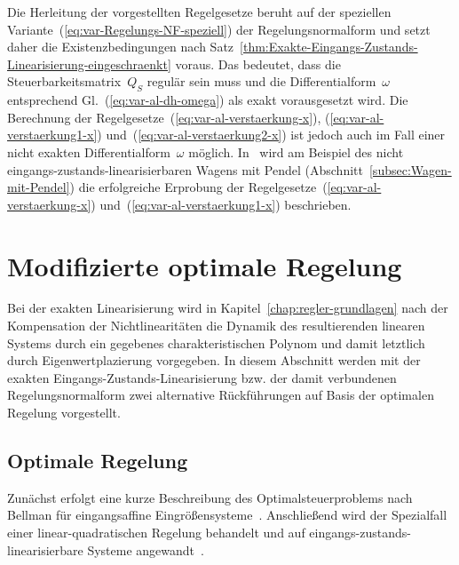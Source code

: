 \medskip{}

Die Herleitung der vorgestellten Regelgesetze beruht auf der speziellen
Variante~(\ref{eq:var-Regelungs-NF-speziell}) der Regelungsnormalform
und setzt daher die Existenzbedingungen nach Satz~\ref{thm:Exakte-Eingangs-Zustands-Linearisierung-eingeschraenkt}
voraus. Das bedeutet, dass die Steuerbarkeitsmatrix~$Q_{S}$ regulär
sein muss und die Differentialform~$\omega$ entsprechend Gl.~(\ref{eq:var-al-dh-omega})
als exakt vorausgesetzt wird. Die Berechnung der Regelgesetze~(\ref{eq:var-al-verstaerkung-x}),
(\ref{eq:var-al-verstaerkung1-x}) und~(\ref{eq:var-al-verstaerkung2-x})
ist jedoch auch im Fall einer nicht exakten Differentialform~$\omega$
möglich. In~\cite{roebenack2012pamm,roebenack2013ecc} wird am Beispiel
des nicht eingangs-zustands-linearisierbaren Wagens mit Pendel (Abschnitt~\ref{subsec:Wagen-mit-Pendel})
die erfolgreiche Erprobung der Regelgesetze~(\ref{eq:var-al-verstaerkung-x})
und~(\ref{eq:var-al-verstaerkung1-x}) beschrieben.

\section{Modifizierte optimale Regelung\label{sec:Modifizierte-optimale-Regelung}}

Bei der exakten Linearisierung wird in Kapitel~\ref{chap:regler-grundlagen}
nach der Kompensation der Nichtlinearitäten die Dynamik des resultierenden
linearen Systems durch ein gegebenes charakteristischen Polynom und
damit letztlich durch Eigenwertplazierung vorgegeben. In diesem Abschnitt
werden mit der exakten Eingangs-Zustands-Linearisierung bzw. der damit
verbundenen Regelungsnormalform zwei alternative Rückführungen auf
Basis der optimalen Regelung vorgestellt.

\subsection{Optimale Regelung}

Zunächst erfolgt eine kurze Beschreibung des Optimalsteuerproblems
nach Bellman für eingangsaffine Eingrößensysteme~\cite{sontag98}.
Anschließend wird der Spezialfall einer linear-quadratischen Regelung
behandelt und auf eingangs-zustands-linearisierbare Systeme angewandt~\cite{anderson1989}.

